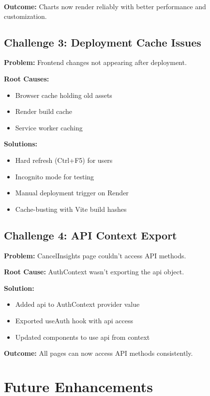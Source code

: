 \documentclass[12pt,a4paper]{article}
\begin{document}
\textbf{Outcome:} Charts now render reliably with better performance and customization.

\subsection{Challenge 3: Deployment Cache Issues}

\textbf{Problem:} Frontend changes not appearing after deployment.

\textbf{Root Causes:}
\begin{itemize}[leftmargin=*]
    \item Browser cache holding old assets
    \item Render build cache
    \item Service worker caching
\end{itemize}

\textbf{Solutions:}
\begin{itemize}[leftmargin=*]
    \item Hard refresh (Ctrl+F5) for users
    \item Incognito mode for testing
    \item Manual deployment trigger on Render
    \item Cache-busting with Vite build hashes
\end{itemize}

\subsection{Challenge 4: API Context Export}

\textbf{Problem:} CancelInsights page couldn't access API methods.

\textbf{Root Cause:} AuthContext wasn't exporting the api object.

\textbf{Solution:}
\begin{itemize}[leftmargin=*]
    \item Added api to AuthContext provider value
    \item Exported useAuth hook with api access
    \item Updated components to use api from context
\end{itemize}

\textbf{Outcome:} All pages can now access API methods consistently.

\newpage

\section{Future Enhancements}
\end{document}
